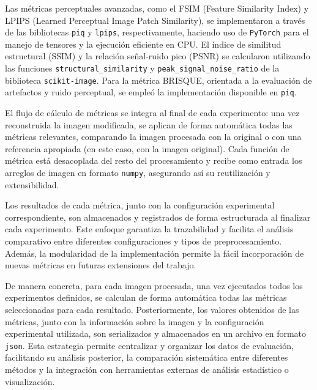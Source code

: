 Las métricas perceptuales avanzadas, como el FSIM (Feature Similarity Index) y LPIPS (Learned Perceptual Image Patch Similarity), se implementaron a través de las bibliotecas \texttt{piq} y \texttt{lpips}, respectivamente, haciendo uso de \texttt{PyTorch} para el manejo de tensores y la ejecución eficiente en CPU. El índice de similitud estructural (SSIM) y la relación señal-ruido pico (PSNR) se calcularon utilizando las funciones \texttt{structural\_similarity} y \texttt{peak\_signal\_noise\_ratio} de la biblioteca \texttt{scikit-image}. Para la métrica BRISQUE, orientada a la evaluación de artefactos y ruido perceptual, se empleó la implementación disponible en \texttt{piq}.

El flujo de cálculo de métricas se integra al final de cada experimento: una vez reconstruida la imagen modificada, se aplican de forma automática todas las métricas relevantes, comparando la imagen procesada con la original o con una referencia apropiada (en este caso, con la imagen original). Cada función de métrica está desacoplada del resto del procesamiento y recibe como entrada los arreglos de imagen en formato \texttt{numpy}, asegurando así su reutilización y extensibilidad.

Los resultados de cada métrica, junto con la configuración experimental correspondiente, son almacenados y registrados de forma estructurada al finalizar cada experimento. Este enfoque garantiza la trazabilidad y facilita el análisis comparativo entre diferentes configuraciones y tipos de preprocesamiento. Además, la modularidad de la implementación permite la fácil incorporación de nuevas métricas en futuras extensiones del trabajo.

De manera concreta, para cada imagen procesada, una vez ejecutados todos los experimentos definidos, se calculan de forma automática todas las métricas seleccionadas para cada resultado. Posteriormente, los valores obtenidos de las métricas, junto con la información sobre la imagen y la configuración experimental utilizada, son serializados y almacenados en un archivo en formato \texttt{json}. Esta estrategia permite centralizar y organizar los datos de evaluación, facilitando su análisis posterior, la comparación sistemática entre diferentes métodos y la integración con herramientas externas de análisis estadístico o visualización.

